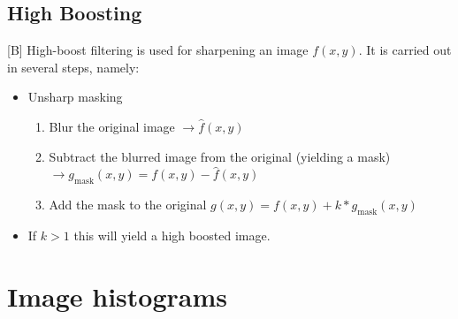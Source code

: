 \documentclass[12pt]{article}
\begin{document}
	\subsection{High Boosting}
	[B] High-boost filtering is used for sharpening an image $f(x,y)$. It is carried out in several steps, 
	namely:
	\begin{itemize}
	\item Unsharp masking \begin{enumerate}
	                        \item Blur the original image $\rightarrow \hat f(x,y)$
	                        \item Subtract the blurred image from the original 
	                        (yielding a mask) $ \rightarrow g_{\mathrm{mask}}(x,y) = f(x,y) - \hat f(x,y)$
	                        \item Add the mask to the original $ g(x,y) = f(x,y) + k * g_{\mathrm{mask}}(x,y)$
	                       \end{enumerate}
	\item If $ k > 1$ this will yield a high boosted image.
	\end{itemize}
%	
%	
\section{Image histograms}
\end{document}
